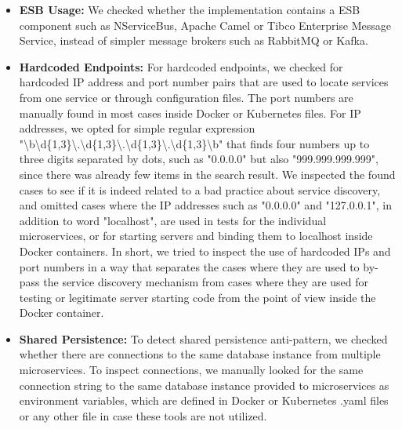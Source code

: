\documentclass{Configuration_Files/PoliMi3i_thesis}
\begin{document}
\begin{itemize}
    \item \textbf{ESB Usage:} We checked whether the implementation contains a ESB component such as NServiceBus\footnotemark[63], Apache Camel\footnotemark[64] or Tibco Enterprise Message Service\footnotemark[65], instead of simpler message brokers such as RabbitMQ or Kafka.
    
    \item \textbf{Hardcoded Endpoints:} For hardcoded endpoints, we checked for hardcoded IP address and port number pairs that are used to locate services from one service or through configuration files.
    The port numbers are manually found in most cases inside Docker or Kubernetes files.
    For IP addresses, we opted for simple regular expression "\textbackslash b\textbackslash d\{1,3\}\textbackslash .\textbackslash d\{1,3\}\textbackslash .\textbackslash d\{1,3\}\textbackslash .\textbackslash d\{1,3\}\textbackslash b"
    that finds four numbers up to three digits separated by dots, such as "0.0.0.0" but also "999.999.999.999", since there was already few items in the search result.
    We inspected the found cases to see if it is indeed related to a bad practice about service discovery, and omitted cases where the IP addresses such as "0.0.0.0" and "127.0.0.1", in addition to word "localhost", are used in tests for the individual microservices, or for starting servers and binding them to localhost inside Docker containers.
    In short, we tried to inspect the use of hardcoded IPs and port numbers in a way that separates the cases where they are used to by-pass the service discovery mechanism from cases where they are used for testing or legitimate server starting code from the point of view inside the Docker container.
    
    \item \textbf{Shared Persistence:} To detect shared persistence anti-pattern, we checked whether there are connections to the same database instance from multiple microservices.
    To inspect connections, we manually looked for the same connection string to the same database instance provided to microservices as environment variables, which are defined in Docker or Kubernetes .yaml files or any other file in case these tools are not utilized.
    

\end{itemize}
\end{document}
